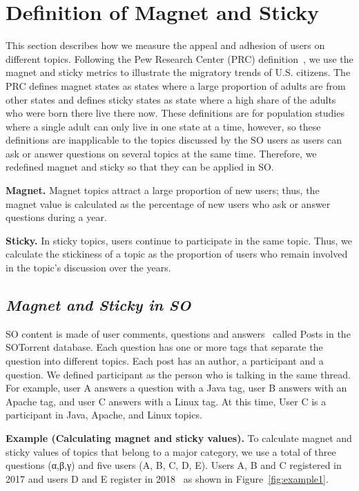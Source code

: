 \documentclass[conference]{IEEEtran}
\begin{document}
\section{Definition of Magnet and Sticky} \label{magnet}
This section describes how we measure the appeal and adhesion of users on different topics. Following the Pew Research Center (PRC) definition~\cite{communityeconomic}, we use the magnet and sticky metrics to illustrate the migratory trends of U.S. citizens. The PRC defines magnet states as states where a large proportion of adults are from other states and defines sticky states as state where a high share of the adults who were born there live there now. These definitions are for population studies where a single adult can only live in one state at a time, however, so these definitions are inapplicable to the topics discussed by the SO users as users can ask or answer questions on several topics at the same time. Therefore, we redefined magnet and sticky so that they can be applied in SO. 

\noindent
\textbf{Magnet.} Magnet topics attract a large proportion of new users; thus, the magnet value is calculated as the percentage of new users who ask or answer questions during a year.

\noindent
\textbf{Sticky.} In sticky topics, users continue to participate in the same topic. Thus, we calculate the stickiness of a topic as the proportion of users who remain involved in the topic’s discussion over the years.


\subsection*{\textit{\textbf{Magnet and Sticky in SO}}}

SO content is made of user comments, questions and answers~\cite{liu2018mining} called Posts in the  SOTorrent\cite{baltes2018sotorrent} database. Each question has one or more tags that separate the question into different topics. Each post has an author, a participant and a question. We defined participant as the person who is talking in the same thread. For example, user A answers a question with a Java tag, user B answers with an Apache tag, and user C answers with a Linux tag. At this time, User C is a participant in Java, Apache, and Linux topics.


\noindent
\textbf{Example (Calculating magnet and sticky values).}
To calculate magnet and sticky values of topics that belong to a major category, we use a total of three questions (α,β,γ) and five users (A, B, C, D, E). Users A, B and C registered in 2017 and users D and E register in 2018~\cite{yamashita2016magnet} as shown in Figure~\ref{fig:example1}.
\end{document}
